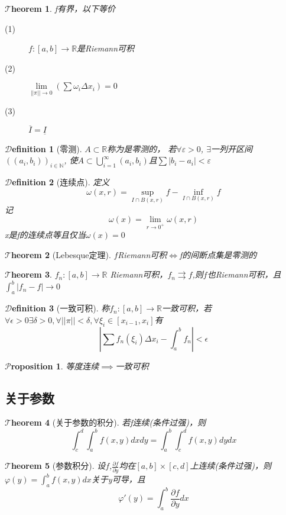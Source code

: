 \documentclass[hyperfer,UTF8,a4paper,12pt]{article}
\theoremstyle{plain}
\newtheorem{Thm}{$\mathcal{T}$heorem}
\newtheorem*{Prop}{$\mathcal{P}$roposition}
\newtheorem{Def}{{$\mathcal{D}$efinition}}[section]
\begin{document}
\begin{Thm}
	f有界，以下等价
	\begin{description}
		\item[(1)]$ f:[a,b]\to\mathbb{R} $是Riemann可积 
		\item[(2)]$\lim\limits_{||\pi||\to0}(\sum\omega_i\Delta x_i)=0$
		\item[(3)]$ \overline{I}=\underline{I} $
	\end{description}
\end{Thm}

\begin{Def}[零测]
	$ A\subset \mathbb{R} $称为是零测的，
	若$ \forall\varepsilon>0 $,
	$ \exists $一列开区间 $ ((a_i,b_i))_{i\in\mathbb{N}} $,
	使$ A\subset \bigcup\limits_{i=1}^{\infty}(a_i,b_i) $且$\sum |b_i-a_i|<\varepsilon $ 
\end{Def}
\begin{Def}[连续点]
	定义\[ \omega(x,r)=\sup\limits_{I\cap B(x,r)}f-\inf \limits_{I\cap B(x,r)}f\]
	记\[ \omega(x)=\lim\limits_{r\to0^+}\omega(x,r)  \]
	x是f的连续点等且仅当$ \omega(x)=0 $
\end{Def}

\begin{Thm}[Lebesque定理]
	$ f $Riemann可积$\Leftrightarrow$f的间断点集是零测的
\end{Thm}

\begin{Thm}
	$ f_n:[a,b]\to\mathbb{R} $ Riemann可积，$ f_n\rightrightarrows f $,则$ f $也Riemann可积，且$ \int_{a}^{b}|f_n-f|\to 0 $
\end{Thm}

\begin{Def}[一致可积]
	称$ f_n:[a,b]\to\mathbb{R} $一致可积，若$ \forall\epsilon>0\exists\delta>0,\forall||\pi||<\delta,\forall\xi_i\in[x_{i-1},x_i] $有\[ |\sum f_n(\xi_i)\Delta x_i-\int_{a}^{b}f_n|<\epsilon \]
\end{Def}
\begin{Prop}
	等度连续$ \implies $一致可积
\end{Prop}
\subsection{关于参数}

\begin{Thm}[关于参数的积分]
	若f连续(条件过强)，则
	\[\int_{c}^{d}\int_{a}^{b}f(x,y)dxdy=\int_{a}^{b}\int_{c}^{d}f(x,y)dydx \]
\end{Thm}

\begin{Thm}[参数积分]
	设$ f $,$ \frac{\partial f}{\partial y} $均在$ [a,b]\times[c,d] $上连续(条件过强)，则$ \varphi(y)=\int_{a}^{b}f(x,y)dx $关于y可导，且\[ \varphi'(y)=\int_{a}^{b}\frac{\partial f}{\partial y}dx \]
\end{Thm}
\end{document}
